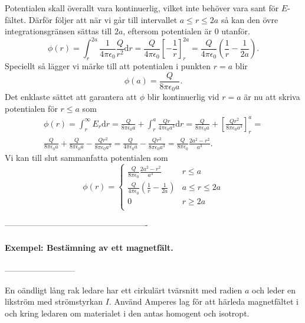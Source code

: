 \documentclass[%
oneside,                 %
final,                   %
10pt]{article}
\begin{document}
Potentialen skall överallt vara kontinuerlig, vilket inte behöver vara
sant för $E$-fältet.  Därför följer att när vi går till
intervallet $a \le r \le 2a$ så kan den övre integrationsgränsen
sättas till $2a$, eftersom potentialen är 0 utanför.
\begin{equation}
  \phi\left(r\right) = \int_r^{2a} \frac{1}{4\pi \epsilon_0} \frac{Q}{r^2}
\mbox{d}r = \frac{Q}{4\pi\epsilon_0}\left[- \frac{1}{r}\right]_r^{2a} =
\frac{Q}{4\pi\epsilon_0} \left(\frac{1}{r}-\frac{1}{2a}\right).
\end{equation}
Speciellt så lägger vi märke till att potentialen i punkten $r = a$
blir
\begin{equation}
  \phi \left(a\right) = \frac{Q}{8\pi \epsilon_0 a}.
\end{equation}
Det enklaste sättet att garantera att $\phi$ blir kontinuerlig vid $r = a$
är nu att skriva potentialen för $r\le a$ som
\begin{align}
  \phi \left(r\right) = \int_r^\infty E_r \mbox{d}r = 
\frac{Q}{8\pi \epsilon_0 a} + \int_r^a \frac{Qr}{4\pi \epsilon_0 a^3} 
\mbox{d}r = \frac{Q}{8\pi \epsilon_0 a} + 
\left[\frac{Qr^2}{8\pi \epsilon_0 a^3}\right]_r^a = \nonumber \\
\frac{Q}{8\pi \epsilon_0 a} 
+  \frac{Q}{8\pi \epsilon_0 a} - \frac{Qr^2}{8\pi \epsilon_0 a^3} = 
\frac{Q}{4\pi \epsilon_0 a} - \frac{Qr^2}{8\pi \epsilon_0 a^3} =
\frac{Q}{8\pi \epsilon_0} \frac{2a^2 -r^2}{a^3}.
\end{align}
Vi kan till slut sammanfatta potentialen som
\begin{equation}
  \phi\left(r\right) = \left\{\begin{array}{lr}
\frac{Q}{8\pi \epsilon_0} \frac{2a^2 -r^2}{a^3} & r\le a\\
\frac{Q}{4\pi \epsilon_0} \left(\frac{1}{r} - \frac{1}{2a}\right) & a\le r \le 
2a\\
0 & r \ge 2a\\
\end{array}
\right.
\end{equation}

----------------------------------------------------

\paragraph{Exempel: Bestämning av ett magnetfält.}
--------------------------

En oändligt lång rak ledare har ett cirkulärt tvärsnitt med radien
$a$ och leder en likström med strömstyrkan $I$.  Använd Amperes lag 
för att härleda magnetfältet i och kring ledaren om materialet i den
antas homogent och isotropt.
\end{document}
